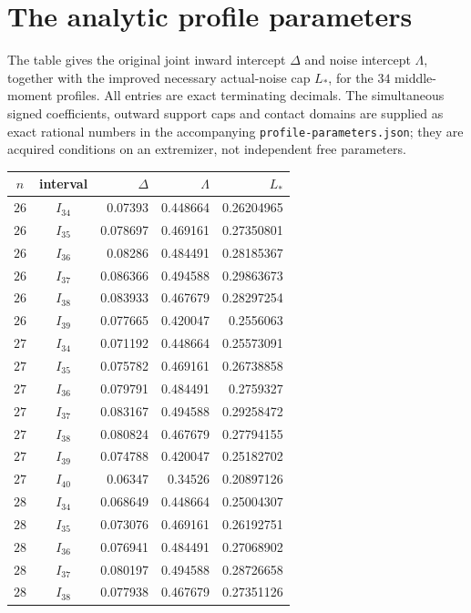 \documentclass[aop,preprint]{imsart}
\theoremstyle{definition}
\numberwithin{equation}{section}
\begin{document}
\section{The analytic profile parameters}\label{app:parameters}
The table gives the original joint inward intercept $\Delta$ and
noise intercept $\Lambda$, together with the improved necessary
actual-noise cap $L_*$, for the $34$ middle-moment profiles.
All entries are exact terminating decimals. The simultaneous
signed coefficients, outward support caps and contact domains
are supplied as exact rational numbers in the accompanying
\texttt{profile-parameters.json}; they are acquired conditions
on an extremizer, not independent free parameters.
\begingroup\small
\begin{longtable}{ccrrr}\toprule
$n$ & interval & $\Delta$ & $\Lambda$ & $L_*$\\\midrule\endhead
$26$ & $I_{34}$ & 0.07393 & 0.448664 & 0.26204965\\
$26$ & $I_{35}$ & 0.078697 & 0.469161 & 0.27350801\\
$26$ & $I_{36}$ & 0.08286 & 0.484491 & 0.28185367\\
$26$ & $I_{37}$ & 0.086366 & 0.494588 & 0.29863673\\
$26$ & $I_{38}$ & 0.083933 & 0.467679 & 0.28297254\\
$26$ & $I_{39}$ & 0.077665 & 0.420047 & 0.2556063\\
\addlinespace
$27$ & $I_{34}$ & 0.071192 & 0.448664 & 0.25573091\\
$27$ & $I_{35}$ & 0.075782 & 0.469161 & 0.26738858\\
$27$ & $I_{36}$ & 0.079791 & 0.484491 & 0.2759327\\
$27$ & $I_{37}$ & 0.083167 & 0.494588 & 0.29258472\\
$27$ & $I_{38}$ & 0.080824 & 0.467679 & 0.27794155\\
$27$ & $I_{39}$ & 0.074788 & 0.420047 & 0.25182702\\
$27$ & $I_{40}$ & 0.06347 & 0.34526 & 0.20897126\\
\addlinespace
$28$ & $I_{34}$ & 0.068649 & 0.448664 & 0.25004307\\
$28$ & $I_{35}$ & 0.073076 & 0.469161 & 0.26192751\\
$28$ & $I_{36}$ & 0.076941 & 0.484491 & 0.27068902\\
$28$ & $I_{37}$ & 0.080197 & 0.494588 & 0.28726658\\
$28$ & $I_{38}$ & 0.077938 & 0.467679 & 0.27351126\\

\end{longtable}
\end{document}
